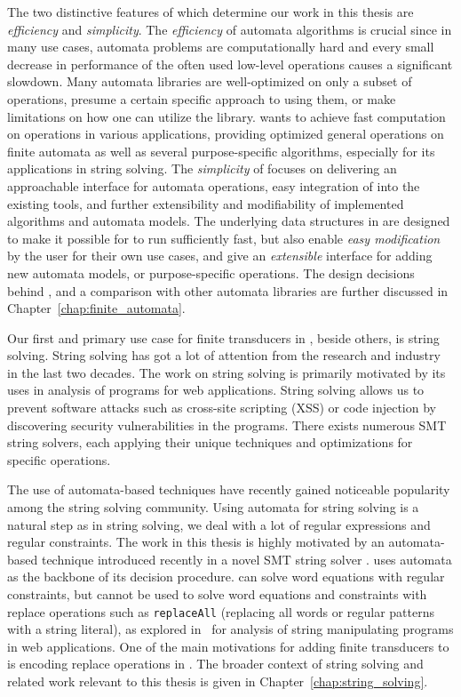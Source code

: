 The two distinctive features of \mata which determine our work in this thesis are \emph{efficiency} and \emph{simplicity}.
The \emph{efficiency} of automata algorithms is crucial since in many use cases, automata problems are computationally hard and every small decrease in performance of the often used low-level operations causes a significant slowdown.
Many automata libraries are well-optimized on only a subset of operations, presume a certain specific approach to using them, or make limitations on how one can utilize the library.
\mata wants to achieve fast computation on operations in various applications, providing optimized general operations on finite automata as well as several purpose-specific algorithms, especially for its applications in string solving.
The \emph{simplicity} of \mata focuses on delivering an approachable interface for automata operations, easy integration of \mata into the existing tools, and further extensibility and modifiability of implemented algorithms and automata models.
The underlying data structures in \mata are designed to make it possible for \mata to run sufficiently fast, but also enable \emph{easy modification} by the user for their own use cases, and give an \emph{extensible} interface for adding new automata models, or purpose-specific operations.
The design decisions behind \mata, and a comparison with other automata libraries are further discussed in Chapter~\ref{chap:finite_automata}.

Our first and primary use case for finite transducers in \mata, beside others, is string solving.
String solving has got a lot of attention from the research and industry in the last two decades.
The work on string solving is primarily motivated by its uses in analysis of programs for web applications.
String solving allows us to prevent software attacks such as cross-site scripting (XSS) or code injection by discovering security vulnerabilities in the programs.
There exists numerous SMT string solvers, each applying their unique techniques and optimizations for specific operations.

The use of automata-based techniques have recently gained noticeable popularity among the string solving community.
Using automata for string solving is a natural step as in string solving, we deal with a lot of regular expressions and regular constraints.
The work in this thesis is highly motivated by an automata-based technique introduced recently in a novel SMT string solver \noodler.
\noodler uses automata as the backbone of its decision procedure.
\noodler can solve word equations with regular constraints, but cannot be used to solve word equations and constraints with replace operations such as \texttt{replaceAll} (replacing all words or regular patterns with a string literal), as explored in~\cite{10.1145/3158091} for analysis of string manipulating programs in web applications.
One of the main motivations for adding finite transducers to \mata is encoding replace operations in \noodler.
The broader context of string solving and related work relevant to this thesis is given in Chapter~\ref{chap:string_solving}.

